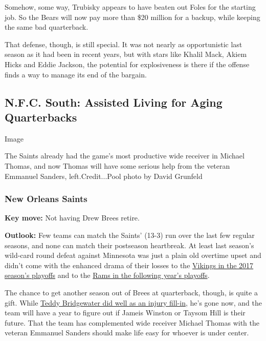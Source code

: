 Somehow, some way, Trubisky appears to have beaten out Foles for the
starting job. So the Bears will now pay more than \$20 million for a
backup, while keeping the same bad quarterback.

That defense, though, is still special. It was not nearly as
opportunistic last season as it had been in recent years, but with stars
like Khalil Mack, Akiem Hicks and Eddie Jackson, the potential for
explosiveness is there if the offense finds a way to manage its end of
the bargain.

\hypertarget{nfc-south-assisted-living-for-aging-quarterbacks}{%
\subsection{N.F.C. South: Assisted Living for Aging
Quarterbacks}\label{nfc-south-assisted-living-for-aging-quarterbacks}}

Image

The Saints already had the game's most productive wide receiver in
Michael Thomas, and now Thomas will have some serious help from the
veteran Emmanuel Sanders, left.Credit...Pool photo by David Grunfeld

\hypertarget{new-orleans-saints}{%
\subsubsection{\texorpdfstring{\textbf{New Orleans
Saints}}{New Orleans Saints}}\label{new-orleans-saints}}

\textbf{Key move:} Not having Drew Brees retire.

\textbf{Outlook:} Few teams can match the Saints' (13-3) run over the
last few regular seasons, and none can match their postseason
heartbreak. At least last season's wild-card round defeat against
Minnesota was just a plain old overtime upset and didn't come with the
enhanced drama of their losses to the
\href{https://www.nytimes3xbfgragh.onion/2018/01/14/sports/vikings-stefon-diggs-saints.html}{Vikings
in the 2017 season's playoffs} and to the
\href{https://www.nytimes3xbfgragh.onion/2019/01/20/sports/saints-rams-call-officials.html}{Rams
in the following year's playoffs}.

The chance to get another season out of Brees at quarterback, though, is
quite a gift. While
\href{https://www.nytimes3xbfgragh.onion/2019/10/21/sports/football/backup-quarterback-teddy-bridgewater-mahomes.html}{Teddy
Bridgewater did well as an injury fill-in}, he's gone now, and the team
will have a year to figure out if Jameis Winston or Taysom Hill is their
future. That the team has complemented wide receiver Michael Thomas with
the veteran Emmanuel Sanders should make life easy for whoever is under
center.


